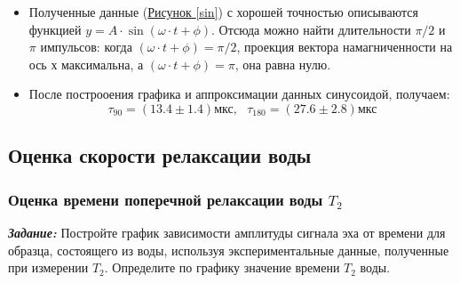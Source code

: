 \documentclass{article}
\begin{document}
\begin{itemize}
\item Полученные данные (\hyperref[sin]{Рисунок \ref*{sin}}) с хорошей точностью описываются функцией $y=A \cdot \sin(\omega \cdot t + \phi)$. Отсюда можно найти длительности $\pi/2 $ и $\pi$ импульсов: когда $(\omega \cdot t + \phi )=\pi /2 $,  проекция вектора намагниченности на ось х максимальна, а $(\omega \cdot t + \phi )=\pi$, она равна нулю. 

\item После построоения графика и аппроксимации данных синусоидой, получаем: 
\begin{equation*}
    \tau_{90} = (13.4\pm 1.4) \text{мкс}, ~~~
    \tau_{180} = (27.6\pm 2.8)\text{мкс}
\end{equation*}

\end{itemize}

\subsection{Оценка скорости релаксации воды} 
\label{relax}

\subsubsection{Оценка времени поперечной релаксации воды $T_2$}\label{t2}


\textbf{\textit{Задание:}} Постройте график зависимости амплитуды сигнала эха от времени для образца, состоящего из воды, используя экспериментальные данные, полученные при измерении $T_2$. Определите по графику значение времени $T_2$ воды.
\end{document}

